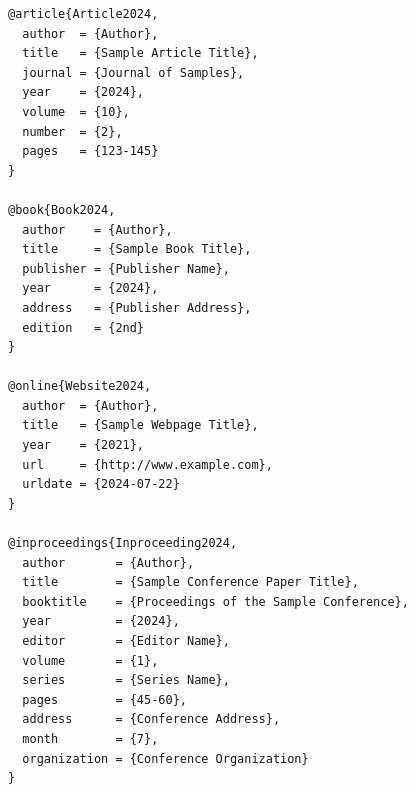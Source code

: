 \begin{lstlisting}
@article{Article2024,
  author  = {Author},
  title   = {Sample Article Title},
  journal = {Journal of Samples},
  year    = {2024},
  volume  = {10},
  number  = {2},
  pages   = {123-145}
}

@book{Book2024,
  author    = {Author},
  title     = {Sample Book Title},
  publisher = {Publisher Name},
  year      = {2024},
  address   = {Publisher Address},
  edition   = {2nd}
}

@online{Website2024,
  author  = {Author},
  title   = {Sample Webpage Title},
  year    = {2021},
  url     = {http://www.example.com},
  urldate = {2024-07-22}
}

@inproceedings{Inproceeding2024,
  author       = {Author},
  title        = {Sample Conference Paper Title},
  booktitle    = {Proceedings of the Sample Conference},
  year         = {2024},
  editor       = {Editor Name},
  volume       = {1},
  series       = {Series Name},
  pages        = {45-60},
  address      = {Conference Address},
  month        = {7},
  organization = {Conference Organization}
}
\end{lstlisting}








